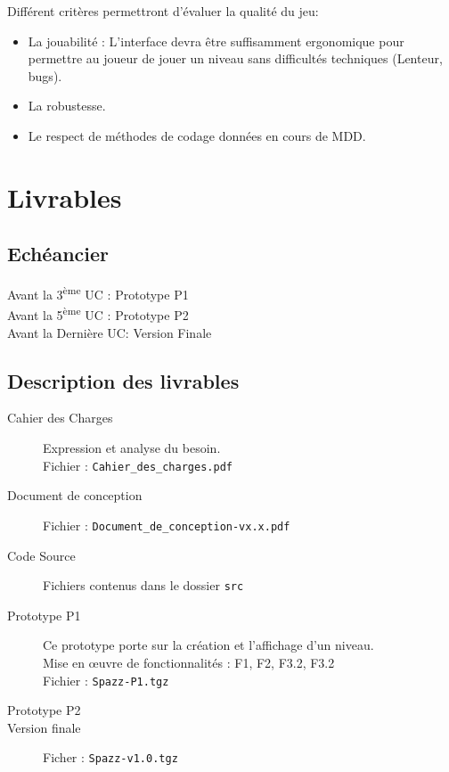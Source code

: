 \documentclass[a4paper,11pt]{scrartcl}
\begin{document}
Différent critères permettront d'évaluer la qualité du jeu:\\
\begin{itemize}[label = $\bullet$]
	\item La jouabilité : L'interface devra être suffisamment ergonomique pour permettre au joueur de jouer un niveau sans difficultés techniques (Lenteur, bugs).
	\item La robustesse.
	\item Le respect de méthodes de codage données en cours de MDD.
\end{itemize}

\section{Livrables}

\subsection{Echéancier}

\noindent
Avant la 3\textsuperscript{ème} UC : Prototype P1 \\
Avant la 5\textsuperscript{ème} UC : Prototype P2 \\
Avant la Dernière UC: Version Finale
\subsection{Description des livrables}

\begin{description}
	\item [Cahier des Charges]	Expression et analyse du besoin.\\
								Fichier : \texttt{Cahier\_des\_charges.pdf}
	\item [Document de conception] Fichier : \texttt{Document\_de\_conception-vx.x.pdf}
    \item [Code Source]  Fichiers contenus dans le dossier \texttt{src}
	\item [Prototype P1] 	Ce prototype porte sur la création et l'affichage d'un niveau.\\
							Mise en œuvre de fonctionnalités : F1, F2, F3.2, F3.2\\
							Fichier : \texttt{Spazz-P1.tgz}
	\item [Prototype P2]
	\item [Version finale] Ficher : \texttt{Spazz-v1.0.tgz}
\end{description}
\end{document}
